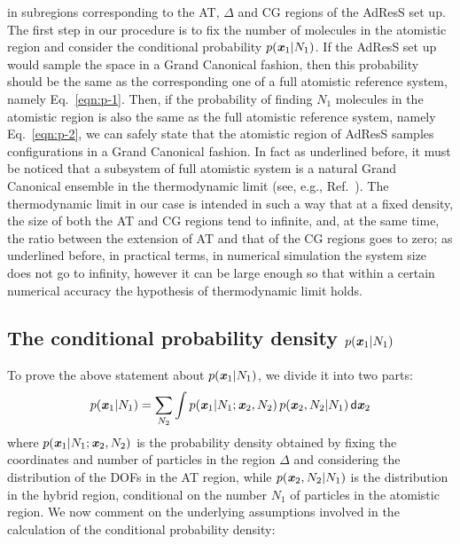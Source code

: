 \documentclass[aip,jcp,a4paper,reprint,onecolumn]{revtex4-1}
\newcommand{\vect}[1]{\textbf{\textit{#1}}}
\newcommand{\dd}[1]{\textsf{#1}}
\newcommand{\HY}{{\Delta}}
\begin{document}
in subregions corresponding to the AT, $\HY$ and CG regions of the AdResS
set up. The first step in our procedure is to fix the number of molecules in the atomistic
region and consider the conditional probability $p(\vect x_1 |
N_1)$. If the AdResS set up would sample the space in a Grand Canonical fashion, then this
probability should be the same as the corresponding one of a full
atomistic reference system, namely Eq.~\eqref{eqn:p-1}.  Then, if the
probability of finding $N_1$ molecules in the atomistic region is also
the same as the full atomistic reference system, namely
Eq.~\eqref{eqn:p-2}, we can safely state that the atomistic region of AdResS
samples configurations in a Grand Canonical fashion. In fact as underlined before, it must be noticed that a subsystem of full atomistic system is a natural Grand Canonical ensemble in the thermodynamic limit (see, e.g., Ref.~). 
The thermodynamic limit in our case is intended in such a way that at a fixed density, the size of
  both the AT and CG regions tend to infinite, and, at the same time,
  the ratio between the extension of AT and that of the CG regions goes to zero; as underlined before, in practical terms, in numerical simulation the system size does not go to infinity, however it can be large enough so that within a certain numerical accuracy the hypothesis of thermodynamic limit holds.


\subsection{The conditional probability density $p(\vect x_1 | N_1)$}  \label{sec:p-1}

%
To prove the above statement about $p(\vect x_1 | N_1)$, we divide it into two parts:
\begin{align}\label{eqn:divide-cond-p}
  p(\vect x_1 | N_1) = \sum_{N_2}\int
  p(\vect x_1 | N_1; \vect x_2, N_2) \,
  p(\vect x_2, N_2 | N_1)
  \,\dd d\vect x_2
\end{align}
where $p(\vect x_1 | N_1; \vect x_2, N_2)$ is the probability density obtained by fixing the
coordinates and number of particles in the region $\HY$ and considering
the distribution of the DOFs in the AT region, while $p(\vect x_2, N_2 | N_1)$ is the distribution in the hybrid region, conditional on the number $N_{1}$ of particles in the atomistic region. We now comment on the underlying assumptions involved in the calculation of the conditional probability density: 
\end{document}
